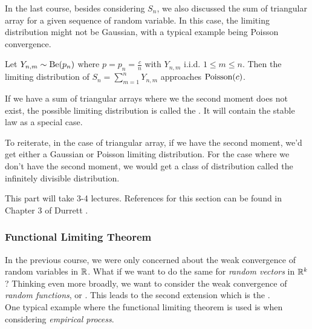 \documentclass[../main/main.tex]{subfiles}
\begin{document}
In the last course, besides considering $S_n$, we also discussed the sum of triangular array for a given sequence of random variable. In this case, the limiting distribution might not be Gaussian, with a typical example being Poisson convergence.

\begin{example}\label{2-8-p1}
	Let $Y_{n,m} \sim \text{Be}(p_n)$ where $p = p_n = \frac{c}{n}$ with $Y_{n,m}$ i.i.d. $1 \leq m \leq n$. Then the limiting distribution of $S_n = \sum\limits_{m=1}^{n}Y_{n,m}$ approaches $\text{Poisson}(c)$.
\end{example}

If we have a sum of triangular arrays where we the second moment does not exist, the possible limiting distribution is called the . It will contain the stable law as a special case.

To reiterate, in the case of triangular array, if we have the second moment, we'd get either a Gaussian or Poisson limiting distribution. For the case where we don't have the second moment, we would get a class of distribution called the infinitely divisible distribution.\\

\begin{remark}
	\noindent This part will take 3-4 lectures. References for this section can be found in Chapter 3 of Durrett \cite{Dur19}.
\end{remark}


\subsubsection{Functional Limiting Theorem}
In the previous course, we were only concerned about the weak convergence of random variables in $\mathbb{R}$. What if we want to do the same for \textit{random vectors} in $\mathbb{R}^{k}$? Thinking even more broadly, we want to consider the weak convergence of \textit{random functions}, or . This leads to the second extension which is the .\\

One typical example where the functional limiting theorem is used is when considering \textit{empirical process}.
\end{document}

